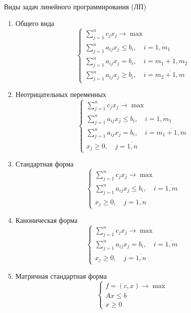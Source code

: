 \documentclass[17pt]{extarticle}
\begin{document}
Виды задач линейного программирования (ЛП)
\begin{enumerate}
    \item Общего вида
          \[
              \begin{cases}
                  \sum\limits_{j=1}^{n} c_j x_j \to \max                                 \\
                  \sum\limits_{j=1}^{n} a_{ij} x_j \le b_i, \quad i = \overline{1,m_1}   \\
                  \sum\limits_{j=1}^{n} a_{ij} x_j = b_i, \quad i = \overline{m_1+1,m_2} \\
                  \sum\limits_{j=1}^{n} a_{ij} x_j \ge b_i, \quad i = \overline{m_2+1,m}
              \end{cases}
          \]
    \item Неотрицательных переменных
          \[
              \begin{cases}
                  \sum\limits_{j=1}^{n} c_j x_j \to \max                               \\
                  \sum\limits_{j=1}^{n} a_{ij} x_j \le b_i, \quad i = \overline{1,m_1} \\
                  \sum\limits_{j=1}^{n} a_{ij} x_j = b_i, \quad i = \overline{m_1+1,m} \\
                  x_j \ge 0, \quad j = \overline{1,n}
              \end{cases}
          \]
    \item Стандартная форма
          \[
              \begin{cases}
                  \sum\limits_{j=1}^{n} c_j x_j \to \max                             \\
                  \sum\limits_{j=1}^{n} a_{ij} x_j \le b_i, \quad i = \overline{1,m} \\
                  x_j \ge 0, \quad j = \overline{1,n}
              \end{cases}
          \]
    \item Каноническая форма
          \[
              \begin{cases}
                  \sum\limits_{j=1}^{n} c_j x_j \to \max                           \\
                  \sum\limits_{j=1}^{n} a_{ij} x_j = b_i, \quad i = \overline{1,m} \\
                  x_j \ge 0, \quad j = \overline{1,n}
              \end{cases}
          \]
    \item Матричная стандартная форма
          \[
              \begin{cases}
                  f=(c, x) \to \max \\
                  A x \le b         \\
                  x \ge 0
              \end{cases}
          \]
\end{enumerate}
\end{document}
